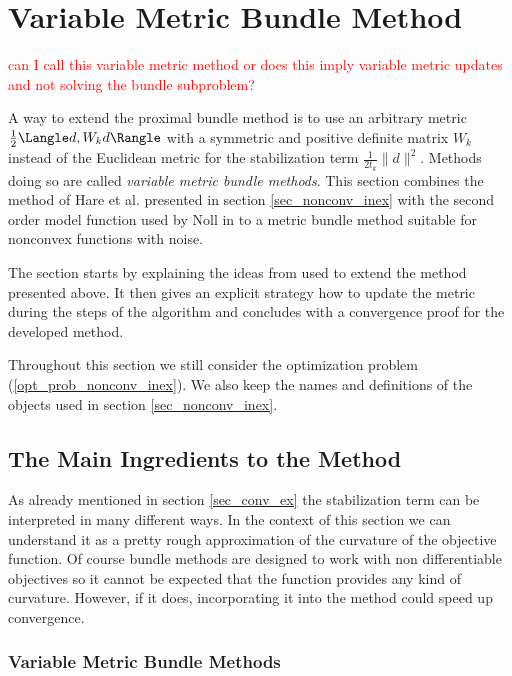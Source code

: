 \section{Variable Metric Bundle Method}
\label{sec_variable_metric}

\textcolor{red}{can I call this variable metric method or does this imply variable metric updates and not solving the bundle subproblem?}

A way to extend the proximal bundle method is to use an arbitrary metric \(\frac{1}{2}\Langle d,W_kd \Rangle\) with a symmetric and positive definite matrix \(W_k\) instead of the Euclidean metric for the stabilization term \(\frac{1}{2t_k}\|d\|^2\). Methods doing so are called \emph{variable metric bundle methods}.
This section combines the method of Hare et al. presented in section \ref{sec_nonconv_inex} with the second order model function used by Noll in \cite{Noll2013} to a metric bundle method suitable for nonconvex functions with noise.

The section starts by explaining the ideas from \cite{Noll2013} used to extend the method presented above. It then gives an explicit strategy how to update the metric during the steps of the algorithm and concludes with a convergence proof for the developed method.

Throughout this section we still consider the optimization problem (\ref{opt_prob_nonconv_inex}). We also keep the names and definitions of the objects used in section \ref{sec_nonconv_inex}.

\subsection{The Main Ingredients to the Method}

As already mentioned in section \ref{sec_conv_ex} the stabilization term can be interpreted in many different ways. In the context of this section we can understand it as a pretty rough approximation of the curvature of the objective function.
Of course bundle methods are designed to work with non differentiable objectives so it cannot be expected that the function provides any kind of curvature. However, if it does, incorporating it into the method could speed up convergence.

\subsubsection{Variable Metric Bundle Methods}

